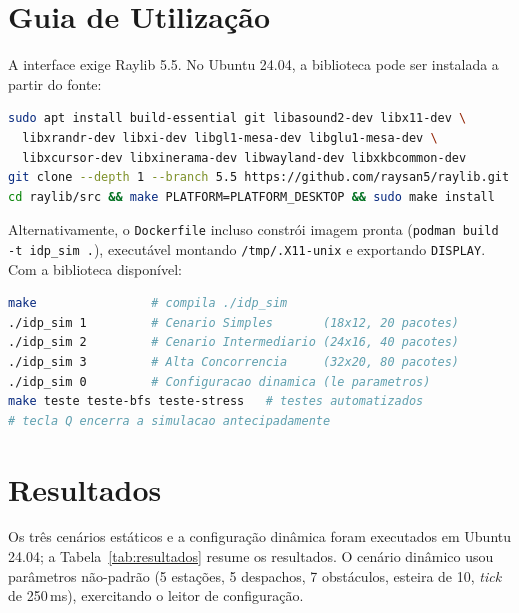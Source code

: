 \documentclass[12pt]{article}
\begin{document}
\section{Guia de Utilização}
\label{sec:uso}

A interface exige Raylib 5.5. No Ubuntu 24.04, a biblioteca pode ser
instalada a partir do fonte:

\begin{lstlisting}[language=bash]
sudo apt install build-essential git libasound2-dev libx11-dev \
  libxrandr-dev libxi-dev libgl1-mesa-dev libglu1-mesa-dev \
  libxcursor-dev libxinerama-dev libwayland-dev libxkbcommon-dev
git clone --depth 1 --branch 5.5 https://github.com/raysan5/raylib.git
cd raylib/src && make PLATFORM=PLATFORM_DESKTOP && sudo make install
\end{lstlisting}

Alternativamente, o \texttt{Dockerfile} incluso constrói imagem pronta
(\texttt{podman build -t idp\_sim .}), executável montando
\texttt{/tmp/.X11-unix} e exportando \texttt{DISPLAY}.  Com a biblioteca
disponível:

\begin{lstlisting}[language=bash]
make                # compila ./idp_sim
./idp_sim 1         # Cenario Simples       (18x12, 20 pacotes)
./idp_sim 2         # Cenario Intermediario (24x16, 40 pacotes)
./idp_sim 3         # Alta Concorrencia     (32x20, 80 pacotes)
./idp_sim 0         # Configuracao dinamica (le parametros)
make teste teste-bfs teste-stress   # testes automatizados
# tecla Q encerra a simulacao antecipadamente
\end{lstlisting}

\section{Resultados}
\label{sec:resultados}

Os três cenários estáticos e a configuração dinâmica foram executados em
Ubuntu 24.04; a Tabela~\ref{tab:resultados} resume os resultados.  O cenário
dinâmico usou parâmetros não-padrão (5 estações, 5 despachos, 7 obstáculos,
esteira de 10, \textit{tick} de 250\,ms), exercitando o leitor de configuração.
\end{document}
